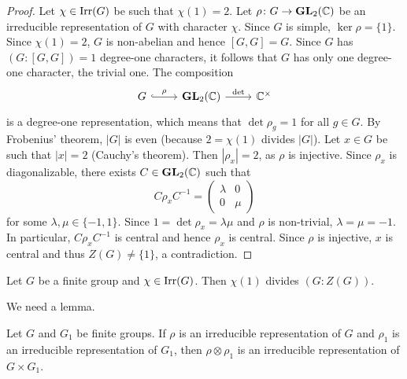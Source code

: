 \begin{proof}
    Let $\chi\in\operatorname{Irr}(G)$ be such that $\chi(1)=2$. Let $\rho\colon G\to\mathbf{GL}_2(\mathbb{C})$
    be an irreducible representation of $G$ with character $\chi$. Since 
    $G$ is simple, $\ker\rho=\{1\}$. Since $\chi(1)=2$, 
    $G$ is non-abelian and hence $[G,G]=G$. Since 
    $G$ has $(G:[G,G])=1$ degree-one characters, it follows that
    $G$ has only one degree-one character, the trivial one. The composition
    \[
    \begin{tikzcd}
    	G & {\GL_2(\C)} & {\C^{\times}}
    	\arrow["{\rho }", hook, from=1-1, to=1-2]
    	\arrow["{\det }", from=1-2, to=1-3]
    \end{tikzcd}
    \]
    is a degree-one representation, which means that $\det\rho_g=1$ for all $g\in G$. 
    By Frobenius' theorem, $|G|$ is even (because 
    $2=\chi(1)$ divides $|G|$). Let $x\in G$ be such that $|x|=2$ (Cauchy's theorem). 
    Then $|\rho_x|=2$, as $\rho$ is injective. Since $\rho_x$ is diagonalizable, 
    there exists $C\in\mathbf{GL}_2(\mathbb{C})$ such that
    \[
    C\rho_xC^{-1}=\begin{pmatrix}
    \lambda&0\\
    0&\mu
    \end{pmatrix}
    \]
    for some $\lambda,\mu\in\{-1,1\}$. Since $1=\det\rho_x=\lambda\mu$ and
    $\rho$ is non-trivial, $\lambda=\mu=-1$. In particular, $C\rho_xC^{-1}$ is central
    and hence $\rho_x$ is central. Since $\rho$ is injective, $x$ is central 
    and thus $Z(G)\ne\{1\}$, a contradiction. 
\end{proof}


\begin{theorem}[Schur]
\label{thm:Schur_chi(1)}
    Let $G$ be a finite group and $\chi\in\operatorname{Irr}(G)$. 
    Then $\chi(1)$ divides $(G:Z(G))$. 
\end{theorem}

We need a lemma. 

\begin{lemma}
    Let $G$ and $G_1$ be finite groups. If $\rho$ is an irreducible
    representation of $G$ and $\rho_1$ is an irreducible representation
    of $G_1$, then 
    $\rho\otimes\rho_1$ is an irreducible representation of $G\times G_1$. 
\end{lemma}

